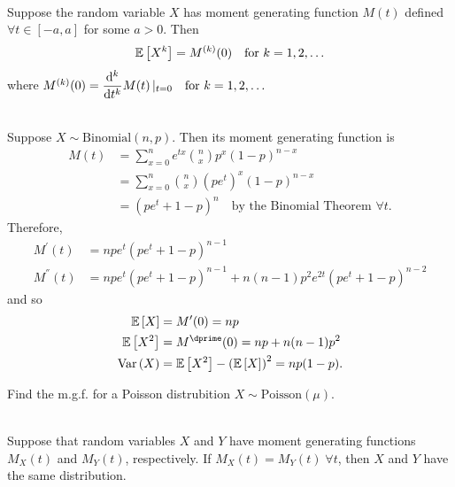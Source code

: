 \begin{theorem}
    \phantom{}\\
    Suppose the random variable $X$ has moment generating function $M(t)$ defined $\forall t \in [-a,a]$ for some $a > 0$. Then \vspace{-3mm}
    \[
        \mathbb{E}\left[{X^k}\right] = M^{(k)}(0) \quad \text{for $k = 1,2,\ldots$}
    \]
    where $M^{(k)}(0) = \displaystyle \frac{\dd^k}{\dd{t^k}} M(t) \, |_{t=0} \quad \text{for } k = 1, 2, \ldots$
\end{theorem}

\pagebreak

\begin{example}
    \phantom{}\\
    Suppose $X \sim \text{Binomial}(n,p)$. Then its moment generating function is
    \begin{align*}
        M(t) &= \displaystyle \sum_{x=0}^{n} e^{tx} \binom{n}{x} p^x (1-p)^{n-x} \\
        &= \displaystyle \sum_{x=0}^{n} \binom{n}{x} (p e^t)^x (1-p)^{n-x} \\
        &=(pe^t + 1 - p)^n \quad \text{by the Binomial Theorem $\forall t$.}
    \end{align*}
    Therefore, \vspace{-3mm}
    \begin{align*}
        M^\prime(t) &= npe^t \left(pe^t + 1 - p\right)^{n-1} \\
        M^\dprime(t) &= npe^t \left(pe^t + 1 - p\right)^{n-1} + n(n-1)p^2 e^{2t} \left(pe^t + 1 - p\right)^{n-2}
    \end{align*}
    and so
    \begin{align*}
        \expect{X} &= M^\prime(0) = np \\
        \expect{X^2} &= M^\dprime(0) = np + n(n-1)p^2 \\
        \Var{X} &= \expect{X^2} - \left( \expect{X} \right)^2 = np(1-p).
    \end{align*}
\end{example}

\begin{example}[exercise]
    Find the m.g.f. for a Poisson distrubition $X \sim \text{Poisson}(\mu)$. \\
\end{example}

\begin{theorem}
    \phantom{}\\
    Suppose that random variables $X$ and $Y$ have moment generating functions $M_X(t)$ and $M_Y(t)$, respectively. If $M_X(t) = M_Y(t) \; \forall t$, then $X$ and $Y$ have the same distribution.
\end{theorem}

